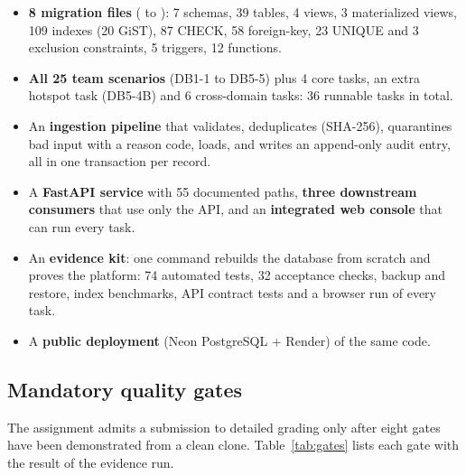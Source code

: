 \documentclass[11pt,a4paper]{article}
\begin{document}
\begin{keybox}
\begin{itemize}
  \item \textbf{8 migration files} ( to ): 7 schemas, 39 tables,
    4 views, 3 materialized views, 109 indexes (20 GiST), 87 CHECK, 58 foreign-key,
    23 UNIQUE and 3 exclusion constraints, 5 triggers, 12 functions.
  \item \textbf{All 25 team scenarios} (DB1-1 to DB5-5) plus 4 core tasks, an extra
    hotspot task (DB5-4B) and 6 cross-domain tasks: 36 runnable tasks in total.
  \item An \textbf{ingestion pipeline} that validates, deduplicates (SHA-256), quarantines
    bad input with a reason code, loads, and writes an append-only audit entry, all in one
    transaction per record.
  \item A \textbf{FastAPI service} with 55 documented paths, \textbf{three downstream
    consumers} that use only the API, and an \textbf{integrated web console} that can run
    every task.
  \item An \textbf{evidence kit}: one command rebuilds the database from scratch and proves
    the platform: 74 automated tests, 32 acceptance checks, backup and restore, index
    benchmarks, API contract tests and a browser run of every task.
  \item A \textbf{public deployment} (Neon PostgreSQL + Render) of the same code.
\end{itemize}
\end{keybox}

\subsection{Mandatory quality gates}

The assignment admits a submission to detailed grading only after eight gates have been
demonstrated from a clean clone. Table~\ref{tab:gates} lists each gate with the result of
the evidence run.
\end{document}
